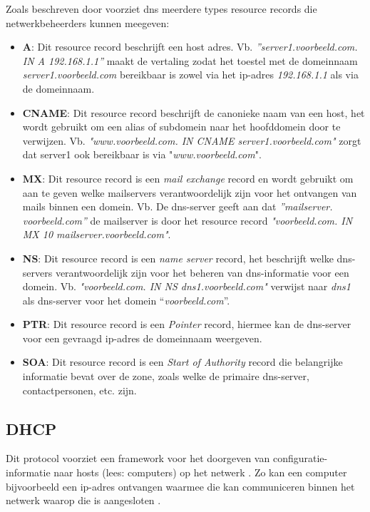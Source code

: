 Zoals beschreven door \textcite{Mockapetris1987} voorziet \acrshort{dns} meerdere types resource records die netwerkbeheerders kunnen meegeven: 
\begin{itemize}
    \item \textbf{A}: Dit resource record beschrijft een host adres. 
    Vb. \textit{”server1.voorbeeld.com. IN A 192.168.1.1”} maakt de vertaling zodat het toestel met de domeinnaam \textit{server1.voorbeeld.com} bereikbaar is zowel via het \acrshort{ip}-adres \textit{192.168.1.1} als via de domeinnaam. 
    \item \textbf{CNAME}: Dit resource record beschrijft de canonieke naam van een host, het wordt gebruikt om een alias of subdomein naar het hoofddomein door te verwijzen. Vb. \textit{"www.voorbeeld.com. IN CNAME server1.voorbeeld.com"} zorgt dat server1 ook bereikbaar is via "\textit{www.voorbeeld.com}".
    \item \textbf{MX}: Dit resource record is een \textit{mail exchange} record en wordt gebruikt om aan te geven welke mailservers verantwoordelijk zijn voor het ontvangen van mails binnen een domein. Vb. De \acrshort{dns}-server geeft aan dat \textit{”mailserver.\\voorbeeld.com”} de mailserver is door het resource record \textit{"voorbeeld.com. IN MX 10 mailserver.voorbeeld.com"}.
    \item \textbf{NS}: Dit resource record is een \textit{name server} record, het beschrijft welke \acrshort{dns}-servers verantwoordelijk zijn voor het beheren van \acrshort{dns}-informatie voor een domein. Vb. \textit{"voorbeeld.com. IN NS dns1.voorbeeld.com"} verwijst naar \textit{dns1} als \acrshort{dns}-server voor het domein “\textit{voorbeeld.com}”.
    \item \textbf{PTR}: Dit resource record is een \textit{Pointer} record, hiermee kan de \acrshort{dns}-server voor een gevraagd \acrshort{ip}-adres de domeinnaam weergeven.
    \item \textbf{SOA}: Dit resource record is een \textit{Start of Authority} record die belangrijke informatie bevat over de zone, zoals welke de primaire \acrshort{dns}-server, contactpersonen, etc. zijn.
\end{itemize}

\subsection{DHCP}
Dit protocol voorziet een framework voor het doorgeven van configuratie-informatie naar hosts (lees: computers) op het netwerk . Zo kan een computer bijvoorbeeld een \acrshort{ip}-adres ontvangen waarmee die kan communiceren binnen het netwerk waarop die is aangesloten \autocite{Droms1997}.

